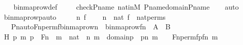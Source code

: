 \begin{isabellebody}
\ \ \isamarkupfalse%
\ binmap{\isacharunderscore}{\kern0pt}row{\isacharprime}{\kern0pt}{\isacharunderscore}{\kern0pt}def\ \isanewline
\ \ \isamarkupfalse%
\ check{\isacharunderscore}{\kern0pt}P{\isacharunderscore}{\kern0pt}name\ nat{\isacharunderscore}{\kern0pt}in{\isacharunderscore}{\kern0pt}M\ P{\isacharunderscore}{\kern0pt}name{\isacharunderscore}{\kern0pt}domain{\isacharunderscore}{\kern0pt}P{\isacharunderscore}{\kern0pt}name\isanewline
\ \ \isamarkupfalse%
\ auto%
\endisatagproof
{\isafoldproof}%
%
\isadelimproof
\ \ \ \ \isanewline
%
\endisadelimproof
\isanewline
{}\isamarkupfalse%
\ binmap{\isacharunderscore}{\kern0pt}row{\isacharprime}{\kern0pt}{\isacharunderscore}{\kern0pt}pauto\ {\isacharcolon}{\kern0pt}\ \isanewline
\ \ \ n\ f\ \isanewline
\ \ \ {\isachardoublequoteopen}n\ {\isasymin}\ nat{\isachardoublequoteclose}\ {\isachardoublequoteopen}f\ {\isasymin}\ nat{\isacharunderscore}{\kern0pt}perms{\isachardoublequoteclose}\ \isanewline
\ \ \ {\isachardoublequoteopen}Pn{\isacharunderscore}{\kern0pt}auto{\isacharparenleft}{\kern0pt}Fn{\isacharunderscore}{\kern0pt}perm{\isacharprime}{\kern0pt}{\isacharparenleft}{\kern0pt}f{\isacharparenright}{\kern0pt}{\isacharparenright}{\kern0pt}{\isacharbackquote}{\kern0pt}binmap{\isacharunderscore}{\kern0pt}row{\isacharprime}{\kern0pt}{\isacharparenleft}{\kern0pt}n{\isacharparenright}{\kern0pt}\ {\isacharequal}{\kern0pt}\ binmap{\isacharunderscore}{\kern0pt}row{\isacharprime}{\kern0pt}{\isacharparenleft}{\kern0pt}f{\isacharbackquote}{\kern0pt}n{\isacharparenright}{\kern0pt}{\isachardoublequoteclose}\ {\isacharparenleft}{\kern0pt}\ {\isachardoublequoteopen}{\isacharquery}{\kern0pt}A\ {\isacharequal}{\kern0pt}\ {\isacharquery}{\kern0pt}B{\isachardoublequoteclose}{\isacharparenright}{\kern0pt}\isanewline
%
\isadelimproof
%
\endisadelimproof
%
\isatagproof
{}\isamarkupfalse%
\ {\isacharminus}{\kern0pt}\ \isanewline
\isanewline
\ \ \isamarkupfalse%
\ H{\isacharcolon}{\kern0pt}\ {\isachardoublequoteopen}{\isasymAnd}p\ m{\isachardot}{\kern0pt}\ p\ {\isasymin}\ Fn\ {\isasymLongrightarrow}\ m\ {\isasymin}\ nat\ {\isasymLongrightarrow}\ {\isacharless}{\kern0pt}n{\isacharcomma}{\kern0pt}\ m{\isachargreater}{\kern0pt}\ {\isasymin}\ domain{\isacharparenleft}{\kern0pt}p{\isacharparenright}{\kern0pt}\ {\isasymLongrightarrow}\ p{\isacharbackquote}{\kern0pt}{\isacharless}{\kern0pt}n{\isacharcomma}{\kern0pt}\ m{\isachargreater}{\kern0pt}\ {\isacharequal}{\kern0pt}\ {}\ {\isasymlongleftrightarrow}\ {\isacharparenleft}{\kern0pt}Fn{\isacharunderscore}{\kern0pt}perm{\isacharprime}{\kern0pt}{\isacharparenleft}{\kern0pt}f{\isacharparenright}{\kern0pt}{\isacharbackquote}{\kern0pt}p{\isacharparenright}{\kern0pt}{\isacharbackquote}{\kern0pt}{\isacharless}{\kern0pt}f{\isacharbackquote}{\kern0pt}n{\isacharcomma}{\kern0pt}\ m{\isachargreater}{\kern0pt}\ {\isacharequal}{\kern0pt}\ {}{\isachardoublequoteclose}\ \isanewline

\end{isabellebody}
